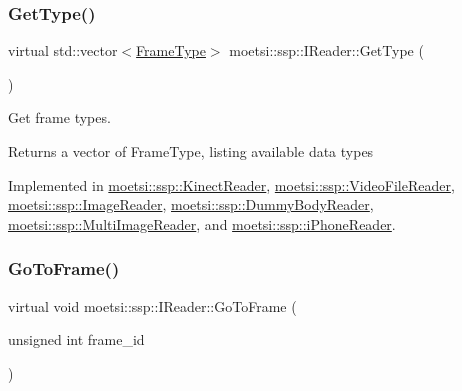 \mbox{\label{classmoetsi_1_1ssp_1_1IReader_a4116c1931fde7bd66133934ffdca1cce}} 
\subsubsection{\texorpdfstring{Get\+Type()}{GetType()}\hspace{0.1cm}{\footnotesize\ttfamily [2/2]}}
{\footnotesize\ttfamily virtual std\+::vector$<$\hyperlink{namespacemoetsi_1_1ssp_a46efdfa2cd5a28ead465dcc8006b5a87}{Frame\+Type}$>$ moetsi\+::ssp\+::\+I\+Reader\+::\+Get\+Type (\begin{DoxyParamCaption}{ }\end{DoxyParamCaption})\hspace{0.3cm}{\ttfamily [pure virtual]}}



Get frame types. 

\begin{DoxyReturn}{Returns}
a vector of Frame\+Type, listing available data types 
\end{DoxyReturn}


Implemented in \hyperlink{classmoetsi_1_1ssp_1_1KinectReader_aef896aa686cbe1ea82dfc6aad46b6ff7}{moetsi\+::ssp\+::\+Kinect\+Reader}, \hyperlink{classmoetsi_1_1ssp_1_1VideoFileReader_a9d47af47299c5fccf766ac2d848a561b}{moetsi\+::ssp\+::\+Video\+File\+Reader}, \hyperlink{classmoetsi_1_1ssp_1_1ImageReader_af6f66957b6e3268c5336f4176c77fc73}{moetsi\+::ssp\+::\+Image\+Reader}, \hyperlink{classmoetsi_1_1ssp_1_1DummyBodyReader_a2219d7fd14ca1448fb4c6f2541ac3c9b}{moetsi\+::ssp\+::\+Dummy\+Body\+Reader}, \hyperlink{classmoetsi_1_1ssp_1_1MultiImageReader_ad5f6cf0cfb1e64bcf569ab0bbfcce9d6}{moetsi\+::ssp\+::\+Multi\+Image\+Reader}, and \hyperlink{classmoetsi_1_1ssp_1_1iPhoneReader_a05d285ace85fc570bc2f453a0862ae56}{moetsi\+::ssp\+::i\+Phone\+Reader}.

\mbox{\label{classmoetsi_1_1ssp_1_1IReader_a6f1be3c06538992cca6d550bd9566681}} 
\subsubsection{\texorpdfstring{Go\+To\+Frame()}{GoToFrame()}\hspace{0.1cm}{\footnotesize\ttfamily [1/2]}}
{\footnotesize\ttfamily virtual void moetsi\+::ssp\+::\+I\+Reader\+::\+Go\+To\+Frame (\begin{DoxyParamCaption}\item[{unsigned int}]{frame\+\_\+id }\end{DoxyParamCaption})\hspace{0.3cm}{\ttfamily [pure virtual]}}



